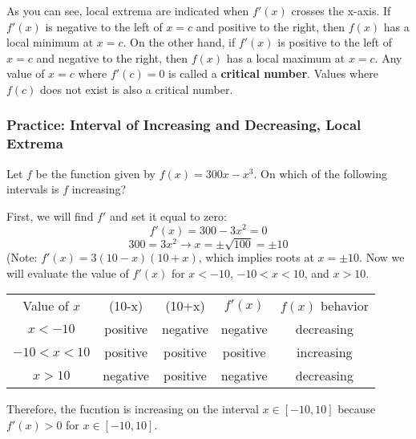 
As you can see, local extrema are indicated when $f'(x)$ crosses the x-axis. If $f'(x)$ is negative to the left of $x=c$ and positive to the right, then $f(x)$ has a local minimum at $x=c$. On the other hand, if $f'(x)$ is positive to the left of $x=c$ and negative to the right, then $f(x)$ has a local maximum at $x=c$. Any value of $x=c$ where $f'(c) = 0$ is called a \textbf{critical number}. Values where $f(c)$ does not exist is also a critical number. 

\subsubsection{Practice: Interval of Increasing and Decreasing, Local Extrema}
\begin{Exercise}
    [label=incdec1]
    Let $f$ be the function given by $f(x) = 300x-x^3$. On which of the following intervals is $f$ increasing?
\end{Exercise}
\begin{Answer}
    [ref=incdec1]
    First, we will find $f'$ and set it equal to zero: $$f'(x)=300-3x^2=0$$ $$300=3x^2 \rightarrow x=\pm \sqrt{100} = \pm10$$ (Note: $f'(x) = 3(10-x)(10+x)$, which implies roots at $x=\pm10$. Now we will evaluate the value of $f'(x)$ for $x<-10$, $-10<x<10$, and $x>10$. 
    \begin{center}
        \begin{tabular}{c|c|c|c|c}
        Value of $x$ & (10-x) & (10+x) & $f'(x)$ & $f(x)$ behavior\\
         $x<-10$    &  positive & negative& negative & decreasing\\
         $-10<x<10$    & positive & positive& positive& increasing\\
         $x>10$ & negative & positive & negative & decreasing
        \end{tabular}
    \end{center}
    Therefore, the fucntion is increasing on the interval $x \in [-10, 10]$ because $f'(x) >0$ for $x \in [-10, 10]$.
\end{Answer}


